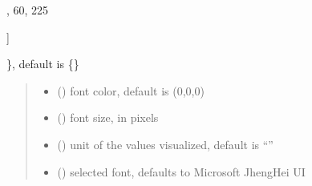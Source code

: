 \documentclass[letterpaper,10pt,english]{sphinxmanual}
\begin{document}
\begin{fulllineitems}
\begin{quote}
\begin{description}
\begin{itemize}
\end{itemize}

\end{description}\end{quote}
\begin{description}
\begin{description}
\sphinxlineitem{\{}\begin{description}
\sphinxlineitem{“United States”: {[}}
,
60,
225

\end{description}

\sphinxAtStartPar
{]}

\end{description}

\sphinxAtStartPar
\}, default is \{\}

\end{description}
\begin{quote}\begin{description}
\begin{itemize}
\item {} 
\sphinxAtStartPar
{} () \textendash{} font color, default is (0,0,0)

\item {} 
\sphinxAtStartPar
{} () \textendash{} font size, in pixels

\item {} 
\sphinxAtStartPar
{} () \textendash{} unit of the values visualized, default is “”

\item {} 
\sphinxAtStartPar
{} () \textendash{} selected font, defaults to Microsoft JhengHei UI

\end{itemize}

\end{description}\end{quote}


\end{fulllineitems}
\end{document}
